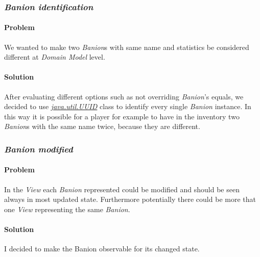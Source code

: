 \documentclass[12pt, a4paper]{report}
\theoremstyle{definition}
\begin{document}
        \pagebreak

        \subsubsection{\emph{Banion identification}}

            \paragraph{Problem}

            We wanted to make two \emph{Banion}s with same name and statistics be considered different at \emph{Domain Model} level.

            \paragraph{Solution}

            After evaluating different options such as not overriding \emph{Banion}'s equals, we decided to use
            \href{https://docs.oracle.com/en/java/javase/17/docs/api/java.base/java/util/UUID.html}{\textit{java.util.UUID}} class to identify every single \emph{Banion} instance.
            In this way it is possible for a player for example to have in the inventory two \emph{Banion}s with the same name twice, because they are different.
            
        \pagebreak

        \subsubsection{\emph{Banion modified}}

            \paragraph{Problem}

            In the \emph{View} each \emph{Banion} represented could be modified and should be seen always in most updated state.
            Furthermore potentially there could be more that one \emph{View} representing the same \emph{Banion}.

            \paragraph{Solution}

            I decided to make the Banion observable for its changed state.
\end{document}
